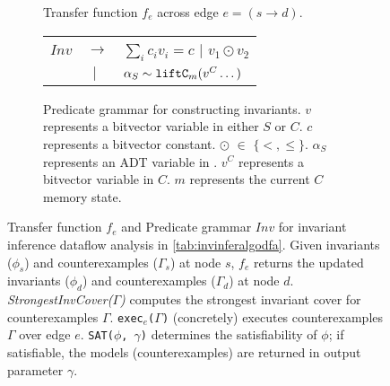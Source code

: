 \begin{figure}[H]
\begin{center}
\begin{subfigure}[b]{.58\textwidth}
\begin{algorithm}[H]
\begin{footnotesize}
\SetAlgoLined
{}
\end{footnotesize}
\end{algorithm}
\caption{\label{algo:invinferalgotf} Transfer function $f_e$ across edge $e=(s\rightarrow d)$.}
\end{subfigure}%
\hfill
{}
\hfill
\begin{subfigure}[b]{.40\textwidth}
\begin{center}
\begin{footnotesize}
\begin{tabular}{p{0.45cm}p{0.15cm}l}
${Inv}$ & $\rightarrow$ & $\sum_{i}{c_i v_i}=c$ $|$ $v_1 \odot v_2$  \\
& $\ \ |$ & $\alpha_S \sim{} {\tt liftC}_m(v^C \dots)$ \\
\end{tabular}
\end{footnotesize}
\end{center}
\caption{\label{fig:invinfergrammar}\footnotesize Predicate grammar for constructing invariants. $v$ represents a bitvector variable in either $S$ or $C$. $c$ represents a bitvector constant. $\odot$ $\in$ $\{<,\leq\}$. $\alpha_S$ represents an ADT variable in \SpecL{}. $v^{C}$ represents a bitvector variable in $C$. $m$ represents the current $C$ memory state.}
\end{subfigure}%
\caption{Transfer function $f_e$ and Predicate grammar $Inv$ for invariant inference dataflow analysis in \cref{tab:invinferalgodfa}.
Given invariants ($\phi_{s}$) and counterexamples ($\Gamma_{s}$) at node $s$,
$f_e$ returns the updated
invariants ($\phi_{d}$) and counterexamples ($\Gamma_{d}$) at
node $d$.
{\em StrongestInvCover($\Gamma$)} computes the strongest invariant cover for counterexamples $\Gamma$.
{\tt exec$_e$($\Gamma$)} (concretely) executes
counterexamples $\Gamma$ over edge $e$.
{\tt SAT($\phi$, $\gamma$)} determines
the satisfiability of $\phi$; if satisfiable, the models (counterexamples) are returned in output parameter $\gamma$.}
\end{center}
\end{figure}